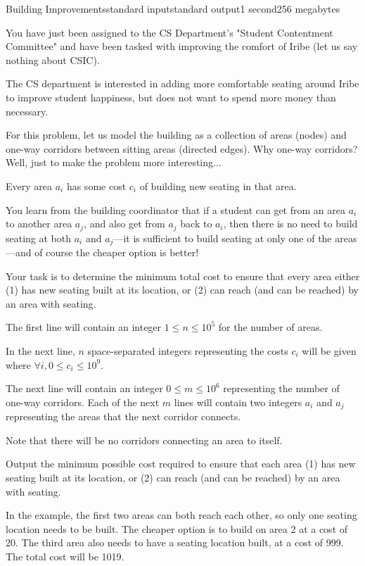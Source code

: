 \begin{problem}{Building Improvements}{standard input}{standard output}{1 second}{256 megabytes}

You have just been assigned to the CS Department's "Student Contentment Committee" and have been tasked with improving the comfort of Iribe (let us say nothing about CSIC).

The CS department is interested in adding more comfortable seating around Iribe to improve student happiness, but does not want to spend more money than necessary.

For this problem, let us model the building as a collection of areas (nodes) and one-way corridors between sitting areas (directed edges). Why one-way corridors? Well, just to make the problem more interesting...

Every area $a_i$ has some cost $c_i$ of building new seating in that area.

You learn from the building coordinator that if a student can get from an area $a_i$ to another area $a_j$, and also get from $a_j$ back to $a_i$, then there is no need to build seating at both $a_i$ and $a_j$---it is sufficient to build seating at only one of the areas---and of course the cheaper option is better!

Your task is to determine the minimum total cost to ensure that every area either (1) has new seating built at its location, or (2) can reach (and can be reached) by an area with seating.

\InputFile
The first line will contain an integer $1 \leq n \leq 10^{5}$ for the number of areas. 

In the next line, $n$ space-separated integers representing the costs $c_i$ will be given where $\forall i, 0 \leq c_i \leq 10^{9}$.

The next line will contain an integer $0 \leq m \leq 10^{6}$ representing the number of one-way corridors. 
Each of the next $m$ lines will contain two integers $a_i$ and $a_j$ representing the areas that the next corridor connects.

Note that there will be no corridors connecting an area to itself.

\OutputFile
Output the minimum possible cost required to ensure that each area (1) has new seating built at its location, or (2) can reach (and can be reached) by an area with seating.

\Example

\begin{example}
%
\end{example}

\Note
In the example, the first two areas can both reach each other, so only one seating location needs to be built. The cheaper option is to build on area 2 at a cost of 20. The third area also needs to have a seating location built, at a cost of 999. The total cost will be 1019.

\end{problem}

